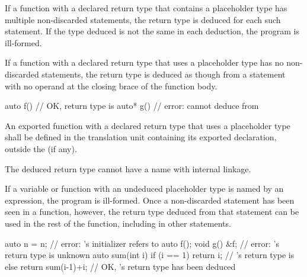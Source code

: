\pnum
If a function with a declared return type that contains a placeholder type has
multiple non-discarded  statements, the return type is deduced for each
such  statement. If the type deduced is not the same in each
deduction, the program is ill-formed.

\pnum
If a function with a declared return type that uses a placeholder type has no
non-discarded  statements, the return type is deduced as though from a
 statement with no operand at the closing brace of the function
body.
\begin{example}
\begin{codeblock}
auto  f() { }                   // OK, return type is 
auto* g() { }                   // error: cannot deduce  from 
\end{codeblock}
\end{example}

\pnum
An exported function
with a declared return type that uses a placeholder type
shall be defined in the translation unit
containing its exported declaration,
outside the  (if any).
\begin{note}
The deduced return type cannot have
a name with internal linkage.
\end{note}

\pnum
If a variable or function with an undeduced placeholder type is named by an
expression, the program is ill-formed.  Once a
non-discarded  statement has been seen in a function, however, the return type deduced
from that statement can be used in the rest of the function, including in other
 statements.
\begin{example}
\begin{codeblock}
auto n = n;                     // error: 's initializer refers to 
auto f();
void g() { &f; }                // error: 's return type is unknown
auto sum(int i) {
  if (i == 1)
    return i;                   // 's return type is 
  else
    return sum(i-1)+i;          // OK, 's return type has been deduced
}
\end{codeblock}
\end{example}

